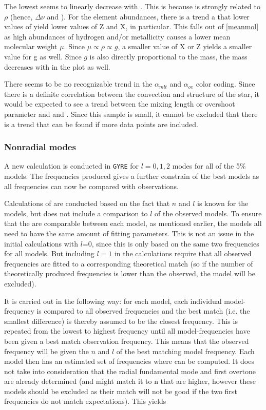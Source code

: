 The lowest \chis seems to linearly decrease with \teff. This is because \logg is strongly related to $\rho$ (hence, $\Delta \nu$ and \teff).  For the element abundances, there is a trend a that lower values of \logg yield lower values of Z and X, in particular. This falls out of \eqref{meanmol} as high abundances of hydrogen and/or metallicity causes a lower mean molecular weight $\mu$. Since $\mu \propto \rho \propto g$, a smaller value of X or Z yields a smaller value for g as well. Since $g$ is also directly proportional to the mass, the mass decreases with \logg in the plot as well. 

There seems to be no recognizable trend in the $\alpha_{mlt}$ and $\alpha_{ov}$ color coding. Since there is a definite correlation between the convection and structure of the star, it would be expected to see a trend between the mixing length or overshoot parameter and \logg and \teff. Since this sample is small, it cannot be excluded that there is a trend that can be found if more data points are included.   


\subsubsection{Nonradial modes}
\label{highermodes}
A new calculation is conducted in \texttt{GYRE} for $l=0,1,2$ modes for all of the 5\% models. The frequencies produced gives a further constrain of the best models as all frequencies can now be compared with observations. 

Calculations of \chis are conducted based on the fact that $n$ and $l$ is known for the models, but does not include a comparison to $l$ of the observed models. To ensure that the \chis are comparable between each model, as mentioned earlier, the models all need to have the same amount of fitting parameters. This is not an issue in the initial \chis calculations with $l$=0, since this \chis is only based on the same two frequencies for all models. But including $l=1$ in the calculations require that all observed frequencies are fitted to a corresponding theoretical match (so if the number of theoretically produced frequencies is lower than the observed, the model will be excluded).

It is carried out in the following way: for each model, each individual model-frequency is compared to all observed frequencies and the best match (i.e. the smallest difference) is thereby assumed to be the closest frequency. This is repeated from the lowest to highest frequency until all model-frequencies have been given a best match observation frequency. This means that the observed frequency will be given the $n$ and $l$ of the best matching model frequency. Each model then has an estimated set of frequencies where \chis can be computed. It does not take into consideration that the radial fundamental mode and first overtone are already determined (and might match it to n that are higher, however these models should be excluded as their match will not be good if the two first frequencies do not match expectations). This yields


